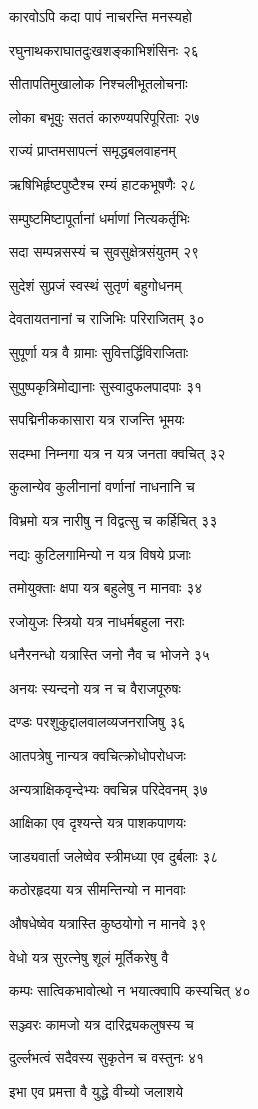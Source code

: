 कारवोऽपि कदा पापं नाचरन्ति मनस्यहो

रघुनाथकराघातदुःखशङ्काभिशंसिनः २६

सीतापतिमुखालोक निश्चलीभूतलोचनाः

लोका बभूवुः सततं कारुण्यपरिपूरिताः २७

राज्यं प्राप्तमसापत्नं समृद्धबलवाहनम्

ऋषिभिर्हृष्टपुष्टैश्च रम्यं हाटकभूषणैः २८

सम्पुष्टमिष्टापूर्तानां धर्माणां नित्यकर्तृभिः

सदा सम्पन्नसस्यं च सुवसुक्षेत्रसंयुतम् २९

सुदेशं सुप्रजं स्वस्थं सुतृणं बहुगोधनम्

देवतायतनानां च राजिभिः परिराजितम् ३०

सुपूर्णा यत्र वै ग्रामाः सुवित्तर्द्धिविराजिताः

सुपुष्पकृत्रिमोद्यानाः सुस्वादुफलपादपाः ३१

सपद्मिनीककासारा यत्र राजन्ति भूमयः

सदम्भा निम्नगा यत्र न यत्र जनता क्वचित् ३२

कुलान्येव कुलीनानां वर्णानां नाधनानि च

विभ्रमो यत्र नारीषु न विद्वत्सु च कर्हिचित् ३३

नद्यः कुटिलगामिन्यो न यत्र विषये प्रजाः

तमोयुक्ताः क्षपा यत्र बहुलेषु न मानवाः ३४

रजोयुजः स्त्रियो यत्र नाधर्मबहुला नराः

धनैरनन्धो यत्रास्ति जनो नैव च भोजने ३५

अनयः स्यन्दनो यत्र न च वैराजपूरुषः

दण्डः परशुकुद्दालवालव्यजनराजिषु ३६

आतपत्रेषु नान्यत्र क्वचित्क्रोधोपरोधजः

अन्यत्राक्षिकवृन्देभ्यः क्वचिन्न परिदेवनम् ३७

आक्षिका एव दृश्यन्ते यत्र पाशकपाणयः

जाड्यवार्ता जलेष्वेव स्त्रीमध्या एव दुर्बलाः ३८

कठोरहृदया यत्र सीमन्तिन्यो न मानवाः

औषधेष्वेव यत्रास्ति कुष्ठयोगो न मानवे ३९

वेधो यत्र सुरत्नेषु शूलं मूर्तिकरेषु वै

कम्पः सात्विकभावोत्थो न भयात्क्वापि कस्यचित् ४०

सञ्ज्वरः कामजो यत्र दारिद्र्यकलुषस्य च

दुर्ल्लभत्वं सदैवस्य सुकृतेन च वस्तुनः ४१

इभा एव प्रमत्ता वै युद्धे वीच्यो जलाशये

